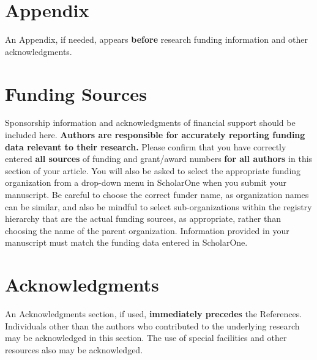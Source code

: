 \documentclass[journal ]{new-aiaa}
\begin{document}
\section*{Appendix}

An Appendix, if needed, appears \textbf{before} research funding information and other acknowledgments.

\section*{Funding Sources}

Sponsorship information and acknowledgments of financial support should be included here. \textbf{Authors are responsible for accurately reporting funding data relevant to their research.} Please confirm that you have correctly entered \textbf{all sources} of funding and grant/award numbers \textbf{for all authors} in this section of your article. You will also be asked to select the appropriate funding organization from a drop-down menu in ScholarOne when you submit your manuscript. Be careful to choose the correct funder name, as organization names can be similar, and also be mindful to select sub-organizations within the registry hierarchy that are the actual funding sources, as appropriate, rather than choosing the name of the parent organization. Information provided in your manuscript must match the funding data entered in ScholarOne.

\section*{Acknowledgments}
An Acknowledgments section, if used, \textbf{immediately precedes} the References. Individuals other than the authors who contributed to the underlying research may be acknowledged in this section. The use of special facilities and other resources also may be acknowledged. 


\end{document}
